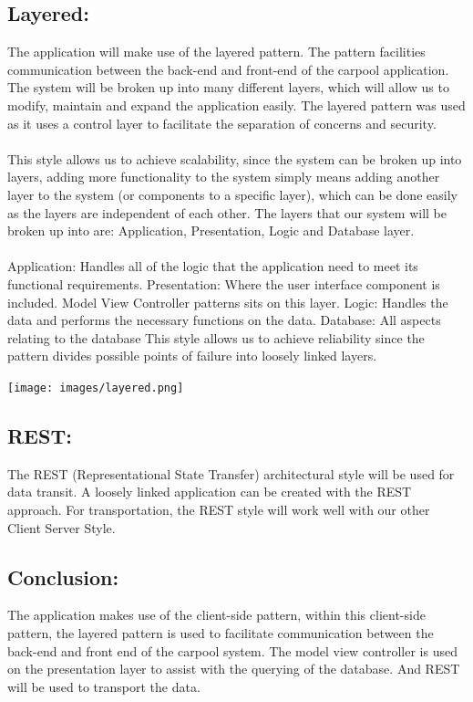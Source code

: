 \documentclass[hidelinks, 12pt, a4paper]{article}
\begin{document}
\subsection{\textbf{Layered:}}
\newline
The application will make use of the layered pattern. The pattern facilities communication between the back-end and front-end of the carpool application. The system will be broken up into many different layers, which will allow us to modify, maintain and expand the application easily.
The layered pattern was used as it uses a control layer to facilitate the separation of concerns and security. \\ \\
This style allows us to achieve scalability, since the system can be broken up into layers, adding more functionality to the system simply means adding another layer to the system (or components to a specific layer), which can be done easily as the layers are independent of each other. The layers that our system will be broken up into are: Application, Presentation, Logic and Database layer.\\ \\
Application: Handles all of the logic that the application need to meet its functional requirements.
Presentation: Where the user interface component is included. Model View Controller patterns sits on this layer.
Logic: Handles the data and performs the necessary functions on the data.
Database: All aspects relating to the database
This style allows us to achieve reliability since the pattern divides possible points of failure into loosely linked layers.
\begin{center}
    \noindent
    \texttt{[image: images/layered.png]}
    \vspace{0.5cm}
\end{center}
\subsection{\textbf{REST:}}
\newline
The REST (Representational State Transfer) architectural style will be used for data transit. A loosely linked application can be created with the REST approach. For transportation, the REST style will work well with our other Client Server Style.
\subsection{\textbf{Conclusion:}}
The application makes use of the client-side pattern, within this client-side pattern, the layered pattern is used to facilitate communication between the back-end and front end of the carpool system. The model view controller is used on the presentation layer to assist with the querying of the database. And REST will be used to transport the data.
\newpage
\end{document}
